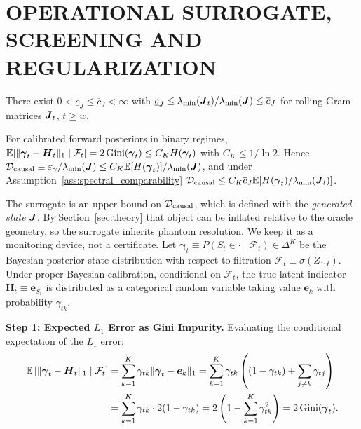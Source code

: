 \section{OPERATIONAL SURROGATE, SCREENING AND REGULARIZATION}
\label{app:surrogate}
\begin{assumption}
\label{ass:spectral_comparability}
There exist $0<\underline c_J\le\overline c_J<\infty$ with $\underline c_J\le\lambda_{\min}(\boldsymbol{J}_t)/\lambda_{\min}(\boldsymbol{J})\le\overline c_J$ for rolling Gram matrices $\boldsymbol{J}_t$, $t\ge w$.
\end{assumption}
\begin{proposition}
\label{prop:bridge}
For calibrated forward posteriors in binary regimes, $\mathbb{E}[\|\boldsymbol{\gamma}_t-\boldsymbol H_t\|_1\mid\mathcal F_t]=2\,\mathrm{Gini}(\boldsymbol{\gamma}_t)\le C_KH(\boldsymbol{\gamma}_t)$ with $C_K\le1/\ln2$. Hence $\mathcal D_{\rm causal}\equiv\varepsilon_\gamma/\lambda_{\min}(\boldsymbol{J})\le C_K\mathbb{E}[H(\boldsymbol{\gamma}_t)]/\lambda_{\min}(\boldsymbol{J})$, and under Assumption~\ref{ass:spectral_comparability} $\mathcal D_{\rm causal}\le C_K\overline c_J\mathbb{E}[H(\boldsymbol{\gamma}_t)/\lambda_{\min}(\boldsymbol{J}_t)]$.
\end{proposition}
The surrogate is an upper bound on $\mathcal D_{\rm causal}$, which is defined with the \emph{generated-state} $\boldsymbol{J}$. By Section~\ref{sec:theory} that object can be inflated relative to the oracle geometry, so the surrogate inherits phantom resolution. We keep it as a monitoring device, not a certificate.
Let $\boldsymbol{\gamma}_t \equiv P(S_t \in \cdot \mid \mathcal{F}_t) \in \Delta^K$ be the Bayesian posterior state distribution with respect to filtration $\mathcal{F}_t \equiv \sigma(Z_{1:t})$. Under proper Bayesian calibration, conditional on $\mathcal{F}_t$, the true latent indicator $\boldsymbol{H}_t \equiv \boldsymbol{e}_{S_t}$ is distributed as a categorical random variable taking value $\boldsymbol{e}_k$ with probability $\gamma_{tk}$.

\textbf{Step 1: Expected $L_1$ Error as Gini Impurity.}
Evaluating the conditional expectation of the $L_1$ error:
\begin{align}
    \mathbb{E}\left[ \|\boldsymbol{\gamma}_t - \boldsymbol{H}_t\|_1 \;\middle|\; \mathcal{F}_t \right] &= \sum_{k=1}^K \gamma_{tk} \|\boldsymbol{\gamma}_t - \boldsymbol{e}_k\|_1 = \sum_{k=1}^K \gamma_{tk} \left( (1 - \gamma_{tk}) + \sum_{j \neq k} \gamma_{tj} \right) \nonumber \\
    &= \sum_{k=1}^K \gamma_{tk} \cdot 2(1 - \gamma_{tk}) = 2\left( 1 - \sum_{k=1}^K \gamma_{tk}^2 \right) = 2 \operatorname{Gini}(\boldsymbol{\gamma}_t).
\end{align}

